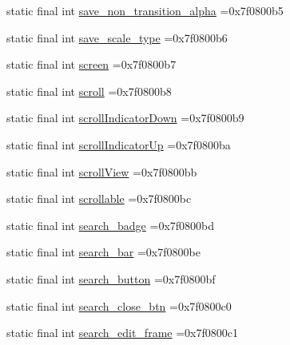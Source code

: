 \begin{DoxyCompactItemize}
static final int \mbox{\hyperlink{classbr_1_1unb_1_1cic_1_1mp_1_1marketmaster_1_1R_1_1id_a2606d8bdf7e218e30232c438d803d7eb}{save\+\_\+non\+\_\+transition\+\_\+alpha}} =0x7f0800b5
\item 
static final int \mbox{\hyperlink{classbr_1_1unb_1_1cic_1_1mp_1_1marketmaster_1_1R_1_1id_aa2a2faa4bf2384edd8f65b6ad11f92fb}{save\+\_\+scale\+\_\+type}} =0x7f0800b6
\item 
static final int \mbox{\hyperlink{classbr_1_1unb_1_1cic_1_1mp_1_1marketmaster_1_1R_1_1id_afdbc4c6c9f2922fa224ad5f5088c6185}{screen}} =0x7f0800b7
\item 
static final int \mbox{\hyperlink{classbr_1_1unb_1_1cic_1_1mp_1_1marketmaster_1_1R_1_1id_a2708d6de6e8b19da40868e2f11fbcee2}{scroll}} =0x7f0800b8
\item 
static final int \mbox{\hyperlink{classbr_1_1unb_1_1cic_1_1mp_1_1marketmaster_1_1R_1_1id_a15c4c1f6faeceb78c5b09e7b8f1fc30a}{scroll\+Indicator\+Down}} =0x7f0800b9
\item 
static final int \mbox{\hyperlink{classbr_1_1unb_1_1cic_1_1mp_1_1marketmaster_1_1R_1_1id_a7a602791736a732b1a6f001dd58a09ca}{scroll\+Indicator\+Up}} =0x7f0800ba
\item 
static final int \mbox{\hyperlink{classbr_1_1unb_1_1cic_1_1mp_1_1marketmaster_1_1R_1_1id_ad96757ff6b646c30f7113b90dd845691}{scroll\+View}} =0x7f0800bb
\item 
static final int \mbox{\hyperlink{classbr_1_1unb_1_1cic_1_1mp_1_1marketmaster_1_1R_1_1id_abed128cfa17c945cc6ab3d6303069403}{scrollable}} =0x7f0800bc
\item 
static final int \mbox{\hyperlink{classbr_1_1unb_1_1cic_1_1mp_1_1marketmaster_1_1R_1_1id_a87bf5dbaba76838a7f4ffb527b30ef8e}{search\+\_\+badge}} =0x7f0800bd
\item 
static final int \mbox{\hyperlink{classbr_1_1unb_1_1cic_1_1mp_1_1marketmaster_1_1R_1_1id_a76157a74bd4c60e8899eb02258dd425f}{search\+\_\+bar}} =0x7f0800be
\item 
static final int \mbox{\hyperlink{classbr_1_1unb_1_1cic_1_1mp_1_1marketmaster_1_1R_1_1id_a62a16a41bd5816d4412999741d09eed7}{search\+\_\+button}} =0x7f0800bf
\item 
static final int \mbox{\hyperlink{classbr_1_1unb_1_1cic_1_1mp_1_1marketmaster_1_1R_1_1id_ad5f015f89ae2c82892502849a2322083}{search\+\_\+close\+\_\+btn}} =0x7f0800c0
\item 
static final int \mbox{\hyperlink{classbr_1_1unb_1_1cic_1_1mp_1_1marketmaster_1_1R_1_1id_a131d372d2718947f8a29a7e2482cacfc}{search\+\_\+edit\+\_\+frame}} =0x7f0800c1

\end{DoxyCompactItemize}
